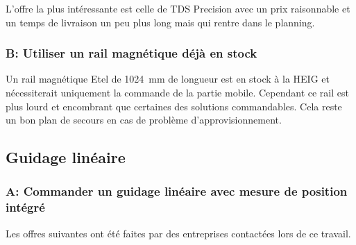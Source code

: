 \begin{table}[H]
  \centering
  \caption{Offres pour le moteur linéaire}
  \label{tab:OffreMot}
\end{table}

L'offre la plus intéressante est celle de TDS Precision avec un prix raisonnable et un temps de livraison un peu plus long mais qui rentre dans le planning.

\subsubsection{B: Utiliser un rail magnétique déjà en stock}
Un rail magnétique Etel de 1024~mm de longueur est en stock à la HEIG et nécessiterait uniquement la commande de la partie mobile. Cependant ce
rail est plus lourd et encombrant que certaines des solutions commandables. Cela reste un bon plan de secours en cas de problème d'approvisionnement.

\subsection{Guidage linéaire}
\subsubsection{A: Commander un guidage linéaire avec mesure de position intégré}
Les offres suivantes ont été faites par des entreprises contactées lors de ce travail.

